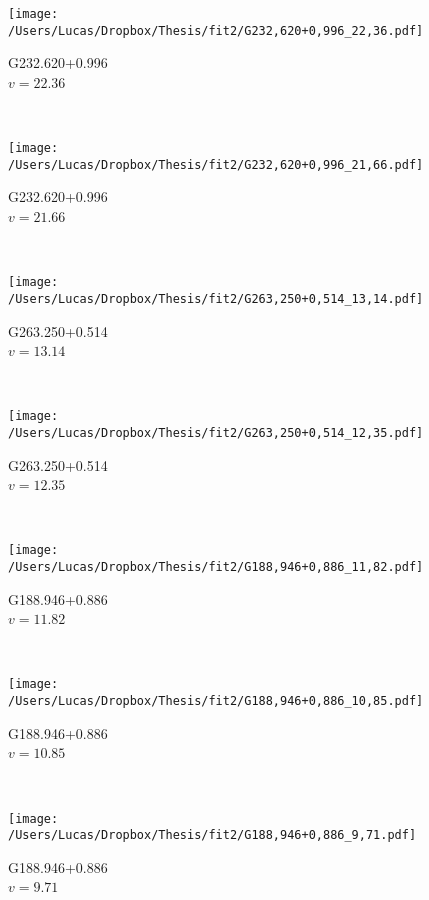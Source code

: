\begin{figure*}[t]\ContinuedFloat
	\centering
	\begin{subfigure}[t]{0.3\textwidth}
		\texttt{[image: /Users/Lucas/Dropbox/Thesis/fit2/G232,620+0,996\_22,36.pdf]}
		\caption[]{G232.620+0.996\\$v=22.36$\,\kms}
	\end{subfigure}
	~
	\begin{subfigure}[t]{0.3\textwidth}
		\texttt{[image: /Users/Lucas/Dropbox/Thesis/fit2/G232,620+0,996\_21,66.pdf]}
		\caption[]{G232.620+0.996\\$v=21.66$\,\kms}
	\end{subfigure}
	~
	\begin{subfigure}[t]{0.3\textwidth}
		\texttt{[image: /Users/Lucas/Dropbox/Thesis/fit2/G263,250+0,514\_13,14.pdf]}
		\caption[]{G263.250+0.514\\$v=13.14$\,\kms}
	\end{subfigure}
	~
	\begin{subfigure}[t]{0.3\textwidth}
		\texttt{[image: /Users/Lucas/Dropbox/Thesis/fit2/G263,250+0,514\_12,35.pdf]}
		\caption[]{G263.250+0.514\\$v=12.35$\,\kms}
	\end{subfigure}
	~
	\begin{subfigure}[t]{0.3\textwidth}
		\texttt{[image: /Users/Lucas/Dropbox/Thesis/fit2/G188,946+0,886\_11,82.pdf]}
		\caption[]{G188.946+0.886\\$v=11.82$\,\kms}
	\end{subfigure}
	~
	\begin{subfigure}[t]{0.3\textwidth}
		\texttt{[image: /Users/Lucas/Dropbox/Thesis/fit2/G188,946+0,886\_10,85.pdf]}
		\caption[]{G188.946+0.886\\$v=10.85$\,\kms}
	\end{subfigure}
	~
	\begin{subfigure}[t]{0.3\textwidth}
		\texttt{[image: /Users/Lucas/Dropbox/Thesis/fit2/G188,946+0,886\_9,71.pdf]}
		\caption[]{G188.946+0.886\\$v=9.71$\,\kms}
	\end{subfigure}

\end{figure*}
